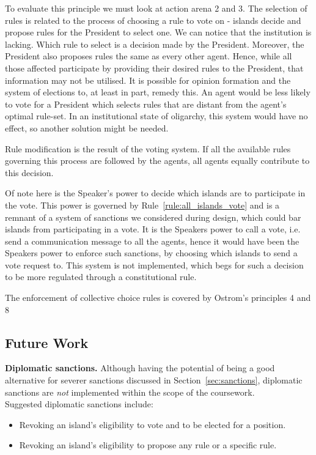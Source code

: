 \begin{enumerate}
    To evaluate this principle we must look at action arena 2 and 3. The selection of rules is related to the process of choosing a rule to vote on - islands decide and propose rules for the President to select one. We can notice that the institution is lacking. Which rule to select is a decision made by the President. Moreover, the President also proposes rules the same as every other agent. Hence, while all those affected participate by providing their desired rules to the President, that information may not be utilised. It is possible for opinion formation and the system of elections to, at least in part, remedy this. An agent would be less likely to vote for a President which selects rules that are distant from the agent's optimal rule-set. In an institutional state of oligarchy, this system would have no effect, so another solution might be needed. 

    Rule modification is the result of the voting system. If all the available rules governing this process are followed by the agents, all agents equally contribute to this decision.  

    Of note here is the Speaker's power to decide which islands are to participate in the vote. This power is governed by Rule~\ref*{rule:all_islands_vote} and is a remnant of a system of sanctions we considered during design, which could bar islands from participating in a vote. It is the Speakers power to call a vote, i.e. send a communication message to all the agents, hence it would have been the Speakers power to enforce such sanctions, by choosing which islands to send a vote request to. This system is not implemented, which begs for such a decision to be more regulated through a constitutional rule.

    The enforcement of collective choice rules is covered by Ostrom's principles 4 and 8
    
\end{enumerate}
\subsection{Future Work}

\textbf{Diplomatic sanctions.} Although having the potential of being a good alternative for severer sanctions discussed in  Section~\ref{sec:sanctions}, diplomatic sanctions are \emph{not} implemented within the scope of the coursework. \\
    Suggested diplomatic sanctions include:
        \begin{itemize}
            \item Revoking an island's eligibility to vote and to be elected for a position.
            \item Revoking an island's eligibility to propose any rule or a specific rule.
        \end{itemize}

